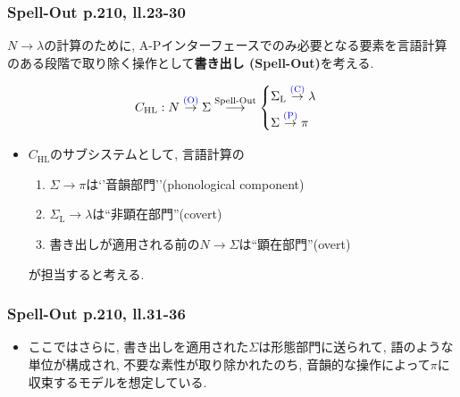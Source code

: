 \documentclass[dvipdfmx, xcolor={dvipsnames},12pt]{beamer}
\begin{document}
\begin{frame}
\frametitle{Spell-Out p.210, ll.23-30}

$N \to \lambda$の計算のために, A-Pインターフェースでのみ必要となる要素を言語計算のある段階で取り除く操作として\textbf{書き出し (Spell-Out)}を考える.

\[
C_{\mathrm{HL}}:
N  \stackrel{{\color{blue}\text{(O)}}}{\rightarrow} \Sigma 
\stackrel{\text{Spell-Out}}{\longrightarrow}
\begin{cases}
\Sigma_{\mathrm{L}} \stackrel{{\color{blue}\text{(C)}}}{\rightarrow} \lambda  \\[4pt]
\Sigma \stackrel{{\color{blue}\text{(P)}}}{\rightarrow} \pi 
\end{cases}
\]

\begin{itemize}
\item $C_{\mathrm{HL}}$のサブシステムとして, 言語計算の

\begin{enumerate}

\item[(P)] $\Sigma \to \pi$は`'音韻部門''(phonological component)
\item[(C)] $\Sigma_{\mathrm{L}} \to \lambda$は``非顕在部門''(covert)
\item[(O)] 書き出しが適用される前の$N\to \Sigma$は``顕在部門''(overt) 

\end{enumerate}
が担当すると考える.
\end{itemize}
\end{frame}

\begin{frame}
\frametitle{Spell-Out p.210, ll.31-36}
\begin{itemize}
\item ここではさらに, 書き出しを適用された$\Sigma$は形態部門に送られて, 語のような単位が構成され, 不要な素性が取り除かれたのち, 音韻的な操作によって$\pi$に収束するモデルを想定している.

\end{itemize}

\end{frame}
\end{document}

